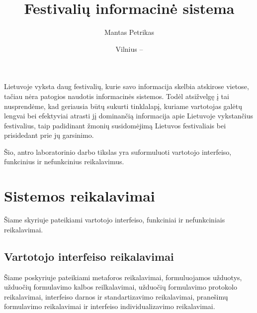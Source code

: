 \documentclass{VUMIFPSkursinis}
\title{Festivalių informacinė sistema}
\author{Mantas Petrikas}
\date{Vilnius – \the\year}
\begin{document}
\maketitle

\tableofcontents

Lietuvoje vyksta daug festivalių, kurie savo informacija skelbia atskirose vietose, tačiau nėra patogios naudotis informacinės sistemos. 
Todėl atsižvelgę į tai nusprendėme, kad geriausia būtų sukurti tinklalapį, kuriame vartotojas galėtų lengvai bei efektyviai atrasti jį dominančią informacija apie Lietuvoje vykstančius festivalius, taip padidinant žmonių susidomėjimą Lietuvos festivaliais bei prisidedant prie jų garsinimo.

Šio, antro laboratorinio darbo tikslas yra suformuluoti vartotojo interfeiso, funkcinius ir nefunkcinius reikalavimus.
\section{Sistemos reikalavimai}
Šiame skyriuje pateikiami vartotojo interfeiso, funkciniai ir nefunkciniais reikalavimai.
\subsection{Vartotojo interfeiso reikalavimai}
Šiame poskyriuje pateikiami metaforos reikalavimai, formuluojamos užduotys, užduočių formulavimo kalbos reilkalavimai, užduočių formulavimo protokolo reikalavimai, interfeiso darnos ir standartizavimo reikalavimai, pranešimų formulavimo reikalavimai ir interfeiso individualizavimo reikalavimai. 
\end{document}
